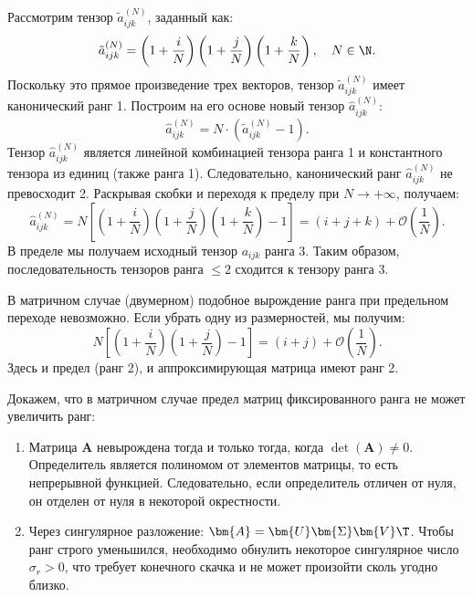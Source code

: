 \begin{tcbproof}
    Рассмотрим тензор $\tilde{a}_{ijk}^{(N)}$, заданный как:
    \[
        \tilde{a}_{ijk}^{(N)} = \left(1 + \frac{i}{N}\right)\left(1 + \frac{j}{N}\right)\left(1 + \frac{k}{N}\right), \quad N \in \N.
    \]
    Поскольку это прямое произведение трех векторов, тензор $\tilde{a}_{ijk}^{(N)}$ имеет канонический ранг 1.
    Построим на его основе новый тензор $\hat{a}_{ijk}^{(N)}$:
    \[
        \hat{a}_{ijk}^{(N)} = N \cdot \left( \tilde{a}_{ijk}^{(N)} - 1 \right).
    \]
    Тензор $\hat{a}_{ijk}^{(N)}$ является линейной комбинацией тензора ранга 1 и константного тензора из единиц (также ранга 1). Следовательно, канонический ранг $\hat{a}_{ijk}^{(N)}$ не превосходит 2.
    Раскрывая скобки и переходя к пределу при $N \to +\infty$, получаем:
    \[
        \hat{a}_{ijk}^{(N)} = N \left[ \left(1 + \frac{i}{N}\right)\left(1 + \frac{j}{N}\right)\left(1 + \frac{k}{N}\right) - 1 \right] = (i + j + k) + \mathcal{O}\left(\frac{1}{N}\right).
    \]
    В пределе мы получаем исходный тензор $a_{ijk}$ ранга 3. Таким образом, последовательность тензоров ранга $\leq 2$ сходится к тензору ранга 3.
\end{tcbproof}

\begin{tcbremark}
    В матричном случае (двумерном) подобное вырождение ранга при предельном переходе невозможно. Если убрать одну из размерностей, мы получим:
    \[
        N \left[ \left(1 + \frac{i}{N}\right)\left(1 + \frac{j}{N}\right) - 1 \right] = (i + j) + \mathcal{O}\left(\frac{1}{N}\right).
    \]
    Здесь и предел (ранг 2), и аппроксимирующая матрица имеют ранг 2.
    
    Докажем, что в матричном случае предел матриц фиксированного ранга не может увеличить ранг:
    \begin{enumerate}
        \item Матрица $\bm{A}$ невырождена тогда и только тогда, когда $\det(\bm{A}) \neq 0$. Определитель является полиномом от элементов матрицы, то есть непрерывной функцией. Следовательно, если определитель отличен от нуля, он отделен от нуля в некоторой окрестности.
        \item Через сингулярное разложение: $\bm{A} = \bm{U} \bm{\Sigma} \bm{V}\T$. Чтобы ранг строго уменьшился, необходимо обнулить некоторое сингулярное число $\sigma_r > 0$, что требует конечного скачка и не может произойти сколь угодно близко.
    \end{enumerate}
\end{tcbremark}


